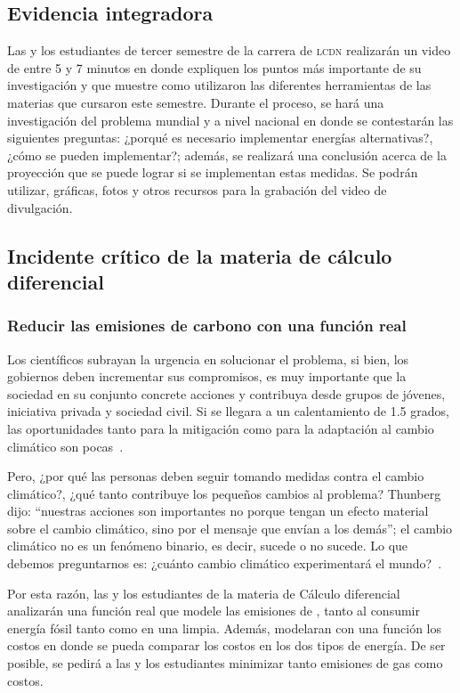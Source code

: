 \documentclass[article,11pt]{memoir}
\begin{document}
\subsection*{Evidencia integradora}
Las y los estudiantes de tercer semestre de la carrera de \textsc{lcdn} realizarán un video de entre 5 y 7 minutos en donde expliquen los puntos más importante de su investigación y que muestre como utilizaron las diferentes herramientas de las materias que cursaron este semestre. Durante el proceso, se hará una investigación del problema mundial y a nivel nacional en donde se contestarán las siguientes preguntas: ¿porqué es necesario implementar energías alternativas?, ¿cómo se pueden implementar?; además, se realizará una conclusión acerca de la proyección que se puede lograr si se implementan estas medidas. Se podrán utilizar, gráficas, fotos y otros recursos para la grabación del video de divulgación.

\subsection*{Incidente crítico de la materia de cálculo diferencial}
\subsubsection*{Reducir las emisiones de carbono con una función real}
Los científicos subrayan la urgencia en solucionar el problema, si bien, los gobiernos deben incrementar sus compromisos, es muy importante que la sociedad en su conjunto concrete acciones y contribuya desde grupos de jóvenes, iniciativa privada y sociedad civil. Si se llegara a un calentamiento de 1.5 grados, las oportunidades tanto para la mitigación como para la adaptación al cambio climático son pocas~\parencite{Urge}.

Pero, ¿por qué las personas deben seguir tomando medidas contra el cambio climático?, ¿qué tanto contribuye los pequeños cambios al problema? Thunberg dijo: ``nuestras acciones son importantes no porque tengan un efecto material sobre el cambio climático, sino por el mensaje que envían a los demás''; el cambio climático no es un fenómeno binario, es decir, sucede o no sucede. Lo que debemos preguntarnos es: ¿cuánto cambio climático experimentará el mundo?~\parencite{Thunberg}.

Por esta razón, las y los estudiantes de la materia de Cálculo diferencial analizarán una función real que modele las emisiones de , tanto al consumir energía fósil tanto como en una limpia. Además, modelaran con una función los costos en donde se pueda comparar los costos en los dos tipos de energía. De ser posible, se pedirá a las y los estudiantes minimizar tanto emisiones de gas como costos.

\printbibliography
\end{document}
